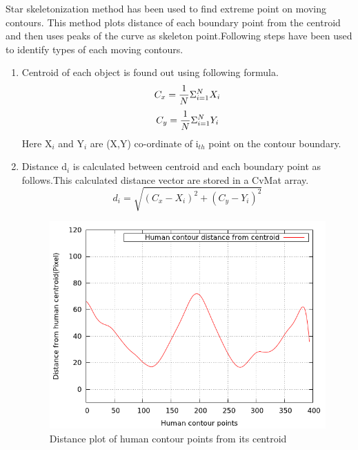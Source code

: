 \documentclass[conference]{IEEEtran}
\begin{document}
Star skeletonization method has been used to find extreme point on
moving contours. This method plots distance of each boundary point from
the centroid and then uses peaks of the curve as skeleton
point.Following steps have been used to identify types of each moving
contours.
\begin{enumerate}
\item Centroid of each object is found out using following formula.\\
	\begin{equation}
	C_x = {1 \over N} \Sigma ^N _{i = 1} X_i 
	\end{equation}
	\begin{equation}
	C_y = {1 \over N} \Sigma ^N _{i = 1} Y_i 
	\end{equation}
Here X$_i$ and Y$_i$ are (X,Y) co-ordinate of i$_{th}$ point on the contour
boundary.
\item Distance d$_i$ is calculated between centroid and each boundary
point as follows.This calculated distance vector are stored in a CvMat
array.
	\begin{equation}
	d_i = \sqrt{(C_x - X_i)^2 + (C_y - Y_i)^2}
	\end{equation}

\begin{figure}[!h]
\centering
\includegraphics[scale=0.35]{figures/distance}
\caption{Distance plot of human contour points from its centroid}
\label{distance}
\end{figure}


\end{enumerate}
\end{document}
